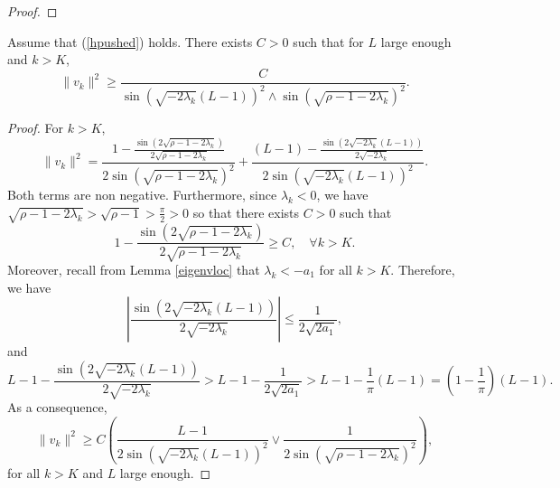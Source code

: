 \documentclass[11pt]{article}
\theoremstyle{plain}
\begin{document}
\begin{appendix}
\begin{proof}
\end{proof}
\begin{lem}
Assume that (\ref{hpushed}) holds. There exists $C>0$  such that for $L$ large enough and $k>K$, 
\begin{equation*}
\|v_k\|^2\geqslant \frac{C}{\sin(\sqrt{-2\lambda_k}(L-1))^2\wedge\sin(\sqrt{\rho-1-2\lambda_k})^2}.
\end{equation*}
\label{lem:normK}
\end{lem}
\begin{proof} For $k>K$, 
$$\|v_k\|^2=\frac{1-\frac{\sin(2\sqrt{\rho-1-2\lambda_k})}{2\sqrt{\rho-1-2\lambda_k}}}{2\sin(\sqrt{\rho-1-2\lambda_k})^2}+\frac{(L-1)-\frac{\sin(2\sqrt{-2\lambda_k}(L-1))}{2\sqrt{-2\lambda_k}}}{2\sin(\sqrt{-2\lambda_k}(L-1))^2}.$$ Both terms are non negative. Furthermore,  since $\lambda_k<0$, we have $\sqrt{\rho-1-2\lambda_k}>\sqrt{\rho-1}>\frac{\pi}{2}>0$ so that there exists $C>0$ such that
\begin{equation*}
1-\frac{\sin(2\sqrt{\rho-1-2\lambda_k})}{2\sqrt{\rho-1-2\lambda_k}}\geqslant C, \quad \forall k>K.
\end{equation*}
Moreover, recall from Lemma \ref{eigenvloc} that $\lambda_k<-a_1$ for all $k>K$. Therefore, we have
 \begin{equation*}
    \left|\frac{\sin(2\sqrt{-2\lambda_k}(L-1))}{2\sqrt{-2\lambda_k}}\right|\leqslant \frac{1}{2\sqrt{ 2 a_1}},
\end{equation*}
and
$$L-1-\frac{\sin(2\sqrt{-2\lambda_k}(L-1))}{2\sqrt{-2\lambda_k}}>L-1-\frac{1}{2\sqrt{2 a_1}}>L-1-\frac{1}{\pi}(L-1)=\left(1-\frac{1}{\pi}\right)(L-1).$$ 
As a consequence,
\begin{equation*}\|v_k\|^2\geqslant C\left(\frac{L-1}{2\sin(\sqrt{-2\lambda_k}(L-1))^2}\vee\frac{1}{2\sin(\sqrt{\rho-1-2\lambda_k})^2}\right),
\end{equation*}
for all $k>K$ and $L$ large enough.
\end{proof}




\end{appendix}
\end{document}
